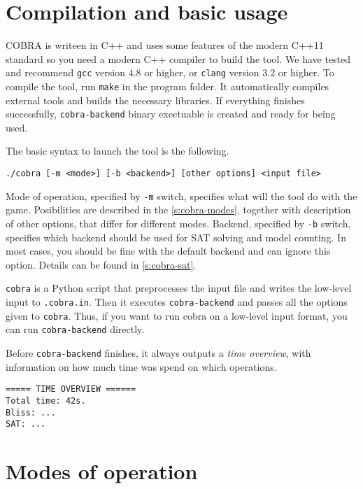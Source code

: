 \section{Compilation and basic usage}

COBRA is writeen in C++ and uses some features of the modern C++11 standard
  so you need a modern C++ compiler to build the tool.
We have tested and recommend \texttt{gcc} version $4.8$ or higher,
  or \texttt{clang} version $3.2$ or higher.
To compile the tool, run
  \texttt{make}
  in the program folder.
It automatically compiles external tools and builds the necessary libraries.
If everything finishes successfully,
  \texttt{cobra-backend} binary exectuable is created and ready for being used.

The basic syntax to launch the tool is the following.

\medskip
\centerline{\texttt{./cobra [-m <mode>] [-b <backend>] [other options] <input file>}}
\medskip


Mode of operation, specified by \texttt{-m} switch,
  specifies what will the tool do with the game.
Posibilities are described in the \autoref{s:cobra-modes}, together with description
  of other options, that differ for different modes.
Backend, specified by \texttt{-b} switch, specifies which backend should be
  used for SAT solving and model counting.
In most cases, you should be fine with the default backend and can ignore this option.
Details can be found in \autoref{s:cobra-sat}.

\texttt{cobra} is a Python script that preprocesses the input file and writes
the low-level input to \texttt{.cobra.in}.
Then it executes \texttt{cobra-backend} and passes all the options given to \texttt{cobra}.
Thus, if you want to run cobra on a low-level input format, you can run
  \texttt{cobra-backend} directly.

Before \texttt{cobra-backend} finishes, it always outputs a \emph{time overview},
with information on how much time was spend on which operations.

\begin{lstlisting}
===== TIME OVERVIEW ======
Total time: 42s.
Bliss: ...
SAT: ...
\end{lstlisting}

\section{Modes of operation}\label{s:cobra-modes}

